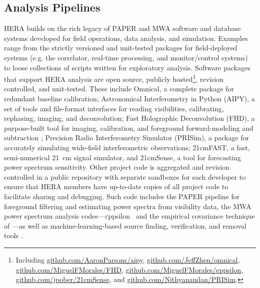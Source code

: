 \documentclass[preprint,11pt]{aastex}
\def\eppsilon{{$\varepsilon$ppsilon}}
\begin{document}

\subsection{Analysis Pipelines} 
\label{sec:software}

\noindent HERA builds on the rich legacy of PAPER and MWA software and database systems 
developed for field operations, data analysis, and simulation.  Examples range from
the strictly versioned and unit-tested packages for field-deployed systems (e.g. the correlator, real-time processing, and
monitor/control systems) to loose collections of scripts written for exploratory analysis.
Software packages that support HERA analysis are open source, publicly 
hosted\footnote{Including \url{github.com/AaronParsons/aipy}, \url{github.com/JeffZhen/omnical}, 
\url{github.com/MiguelFMorales/FHD}, \url{github.com/MiguelFMorales/eppsilon}, \url{github.com/jpober/21cmSense},
and \url{github.com/Nithyanandan/PRISim}.}, revision controlled, and unit-tested.  
These include Omnical, a complete package for redundant baseline calibration;
Astronomical Interferometry in Python (AIPY), a set of
tools and file-format interfaces for reading visibilities, calibrating,
rephasing, imaging, and deconvolution; Fast Holographic Deconvolution
(FHD), a purpose-built tool for imaging, calibration, and foreground
forward-modeling and subtraction \citep{sullivan_et_al2012}; Precision Radio Interferometry Simulator 
(PRISim), a package for accurately simulating wide-field interferometric observations;
21cmFAST, a fast, semi-numerical 21~cm signal simulator,
and 21cmSense, a tool for forecasting power spectrum sensitivity.
Other project code is aggregated and revision
controlled in a public repository with separate sandboxes for each developer to ensure that
HERA members have up-to-date copies of all project code to facilitate sharing and debugging.
Such code includes the PAPER pipeline for foreground filtering and estimating power spectra from
visibility data,
the MWA power spectrum analysis codes---\eppsilon\ \citep{hazelton_et_al2016} and the 
empirical covariance technique of \citet{dillon_et_al2015}---as well as
machine-learning-based source finding, verification, and removal tools \citep{caroll_et_al2016,jacobs_et_al2016,beardsley_et_al2016}. 
\end{document}
